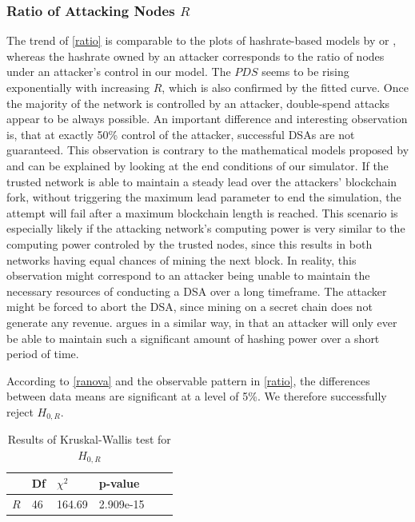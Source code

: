 \documentclass[a4paper,12pt,twoside]{report}
\begin{document}
\subsubsection{Ratio of Attacking Nodes $R$}
The trend of \autoref{ratio} is comparable to the plots of hashrate-based models by \cite{HBDSA} or \cite{DSAwithTime}, whereas the hashrate owned by an attacker corresponds to the ratio of nodes under an attacker's control in our model. The $PDS$ seems to be rising exponentially with increasing $R$, which is also confirmed by the fitted curve. Once the majority of the network is controlled by an attacker, double-spend attacks appear to be always possible. An important difference and interesting observation is, that at exactly 50\% control of the attacker, successful DSAs are not guaranteed. This observation is contrary to the mathematical models proposed by \cite{nakamoto2008bitcoin,HBDSA,DSAwithTime} and can be explained by looking at the end conditions of our simulator. If the trusted network is able to maintain a steady lead over the attackers' blockchain fork, without triggering the maximum lead parameter to end the simulation, the attempt will fail after a maximum blockchain length is reached. This scenario is especially likely if the attacking network's computing power is very similar to the computing power controled by the trusted nodes, since this results in both networks having equal chances of mining the next block. In reality, this observation might correspond to an attacker being unable to maintain the necessary resources of conducting a DSA over a long timeframe. The attacker might be forced to abort the DSA, since mining on a secret chain does not generate any revenue. \cite{longestchain} argues in a similar way, in that an attacker will only ever be able to maintain such a significant amount of hashing power over a short period of time. 

According to \autoref{ranova} and the observable pattern in \autoref{ratio}, the differences between data means are significant at a level of 5\%. We therefore successfully reject $H_{0,R}$.
\begin{table}[hb]
\centering
\begin{tabular}{|l|l|l|l|l|l|} \hline
& Df & $\chi^{2}$ & p-value \\ \hline
$R$ & 46 & 164.69 & 2.909e-15 \\ \hline
\end{tabular}
\caption{Results of Kruskal-Wallis test for $H_{0,R}$}
\label{ranova}
\end{table}
\end{document}

